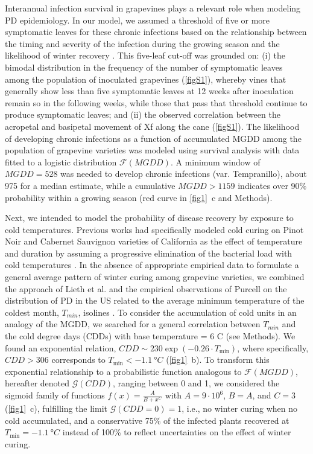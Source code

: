 Interannual infection survival in grapevines plays a relevant role when
modeling PD epidemiology. In our model, we assumed a threshold of five or more
symptomatic leaves for these chronic infections based on the relationship
between the timing and severity of the infection during the growing season and
the likelihood of winter recovery  \cite{Feil2001, Feil2003, Lieth2011}. This
five-leaf cut-off was grounded on: (i) the bimodal distribution in the
frequency of the number of symptomatic leaves among the population of
inoculated grapevines (\cref{figS1}), whereby vines that generally
show less than five symptomatic leaves at 12 weeks after inoculation remain so
in the following weeks, while those that pass that threshold continue to
produce symptomatic leaves; and (ii) the observed correlation between the
acropetal and basipetal movement of Xf along the cane (\cref{figS1}).
The likelihood of developing chronic infections as a function of accumulated
MGDD among the population of grapevine varieties was modeled using survival
analysis with data fitted to a logistic distribution $\mathcal{F}(MGDD)$. A
minimum window of $MGDD=528$ was needed to develop chronic infections (var.
Tempranillo), about 975 for a median estimate, while a cumulative $MGDD>1159$
indicates over 90\% probability within a growing season (red curve in
\cref{fig1}~\textcolor{ref_color}{c} and Methods).

Next, we intended to model the probability of disease recovery by exposure to
cold temperatures. Previous works had specifically modeled cold curing on
Pinot Noir and Cabernet Sauvignon varieties of California as the effect of
temperature and duration \cite{Lieth2011} by assuming a progressive elimination
of the bacterial load with cold temperatures \cite{Feil2003}. In the absence of
appropriate empirical data to formulate a general average pattern of winter
curing among grapevine varieties, we combined the approach of Lieth et al.
\cite{Lieth2011} and the empirical observations of Purcell on the distribution
of PD in the US related to the average minimum temperature of the coldest
month, $T_{min}$, isolines \cite{Anas2008}. To consider
the accumulation of cold units in an analogy of the MGDD, we searched for a
general correlation between $T_{min}$ and the cold degree days (CDDs) with base
temperature = $6$ \textdegree C (see Methods). We found an exponential
relation, $CDD \sim 230\exp(-0.26\cdot T_{\textrm{min}})$, where specifically,
$CDD>306$ corresponds to $T_{\textrm{min}}<\SI{-1.1}{\degree C}$
(\cref{fig1}~\textcolor{ref_color}{b}). To transform this exponential
relationship to a probabilistic
function analogous to $\mathcal{F}(MGDD)$, hereafter denoted
$\mathcal{G}(CDD)$, ranging between 0 and 1, we considered the sigmoid family
of functions $\displaystyle f(x)=\frac{A}{B+x^C}$ with $A=9\cdot 10^6$, $B=A$,
and $C=3$ (\cref{fig1}~\textcolor{ref_color}{c}), fulfilling the limit
$\mathcal{G}(CDD=0)=1$, i.e., no
winter curing when no cold accumulated, and a conservative 75\% of the infected
plants recovered at $T_{\textrm{min}}=\SI{-1.1}{\degree C}$ instead of 100\% to
reflect uncertainties on the effect of winter curing.

